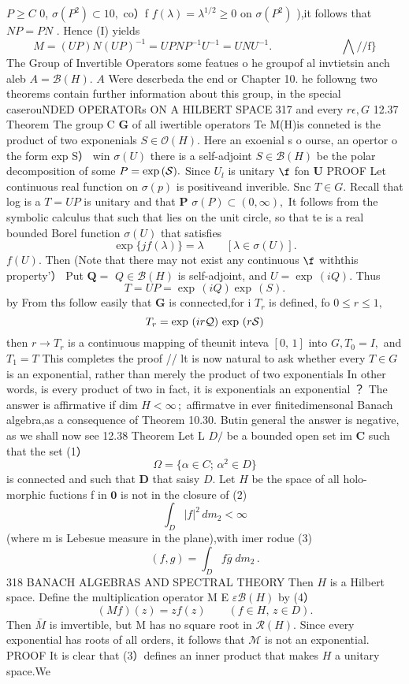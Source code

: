 $\scriptstyle P\geq C$ 0, $\sigma(P^{2})\subset10,$ co）f $f(\lambda)=\lambda^{1/2}\geq0$ on $\sigma(P^{2})$ ),it follows that $N P=P N$ . Hence (I) yields $$ M=(U P)N(U P)^{-1}=U P N P^{-1}U^{-1}=U N U^{-1}.\qquad\qquad\qquad{\mathrm{~\bigwedge//f\}}} $$ The Group of Invertible Operators some featues o he groupof al invtietsin anch aleb $A={\mathcal{B}}(H).$ $\textstyle A$ Were descrbeda the end or Chapter 10. he followng two theorems contain further information about this group, in the special caserouNDED OPERATORs ON A HILBERT SPACE 317 and every $r\epsilon,G$ 12.37 Theorem The group C ${\boldsymbol{G}}$ of all iwertible operators Te M(H)is conneted is the product of two exponenials $S\in{\mathcal{O}}(H).$ Here an exoenial s o ourse, an opertor o the form exp S） win $\sigma(U)$ there is a self-adjoint $S\in{\mathcal{B}}(H)$ be the polar decomposition of some $P=\exp\,({\cal S}).$ Since $U_{\mathit{l}}$ is unitary $\boldsymbol{\f}$ fon ${\boldsymbol{U}}$ PROOF Let continuous real function on $\sigma(p)$ is positiveand inverible. Snc $T\in G.$ Recall that log is a $T=U P$ is unitary and that ${\boldsymbol{P}}$ $\sigma(P)\subset(0,\infty),$ It follows from the symbolic calculus that such that lies on the unit circle, so that te is a real bounded Borel function $\sigma(U)$ that satisfies $$ \exp{\{j f(\lambda)\}}=\lambda\qquad[\lambda\in\sigma(U)]. $$ $f(U).$ Then (Note that there may not exist any continuous $\boldsymbol{\f}$ withthis property'） Put ${\boldsymbol{Q}}=$ $Q\in{\mathcal{B}}(H)$ is self-adjoint, and $U=\exp\,(i Q).$ Thus $$ T=U P=\exp\,(i Q)\exp\,(S). $$ by From ths follow easily that ${\boldsymbol{G}}$ is connected,for i $T_{r}$ is defined, fo $0\leq r\leq1,$ $$ T_{r}=\exp\,\left(i r{\cal Q}\right)\,\exp\,\left(r{\cal S}\right) $$ then $r\to T_{r}$ is a continuous mapping of theunit inteva $\scriptstyle[0,\,1]$ into $G,T_{0}=I,$ and $T_{1}=T$ This completes the proof // lt is now natural to ask whether every $\scriptstyle T\in G$ is an exponential, rather than merely the product of two exponentials In other words, is every product of two in fact, it is exponentials an exponential ？ The answer is affirmative if dim $H<\infty\,;$ affirmatve in ever finitedimensonal Banach algebra,as a consequence of Theorem 10.30. Butin general the answer is negative, as we shall now see 12.38 Theorem Let L $D\!\!\!\!/$ be a bounded open set im ${\boldsymbol{C}}$ such that the set (1） $$ \Omega=\{\alpha\in C;\,\alpha^{2}\in D\} $$ is connected and such that ${\boldsymbol{D}}$ that saisy $D.$ Let $\textstyle H$ be the space of all holo- morphic fuctions f in ${\boldsymbol{0}}$ is not in the closure of (2) $$ \int_{D}\vert f\vert^{2}\,d m_{2}<\infty $$ (where m is Lebesue measure in the plane),with imer rodue (3) $$ (f,g)=\int_{D}f\overline{{{g}}}\;d m_{2}\,. $$318 BANACH ALGEBRAS AND SPECTRAL THEORY Then $H$ is a Hilbert space. Define the multiplication operator M E $\varepsilon{\mathcal{B}}(H)$ by (4） $$ (M f)(z)=z f(z)\qquad(f\in H,\,z\in D). $$ Then $\bar{M}$ is imvertible, but M has no square root in ${\mathcal{R}}(H).$ Since every exponential has roots of all orders, it follows that $\mathcal{M}$ is not an exponential. PROOF It is clear that (3）defines an inner product that makes $\textstyle H$ a unitary space.We 